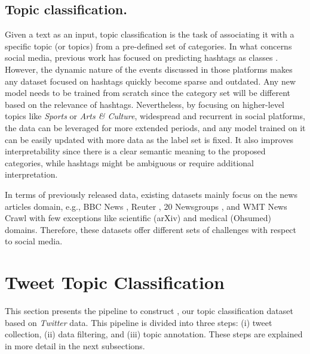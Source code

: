 \subsection{Topic classification.}
Given a text as an input, topic classification is the task of associating it with a specific topic (or topics) from a pre-defined set of categories. In what concerns social media, previous work has focused on predicting hashtags as classes \cite{tweet2vec}. However, the dynamic nature of the events discussed in those platforms makes any dataset focused on hashtags quickly become sparse and outdated. Any new model needs to be trained from scratch since the category set will be different based on the relevance of hashtags. 
Nevertheless, by focusing on higher-level topics like \emph{Sports} or \emph{Arts \& Culture}, widespread and recurrent in social platforms, the data can be leveraged for more extended periods, and any model trained on it can be easily updated with more data as the label set is fixed. It also improves interpretability since there is a clear semantic meaning to the proposed categories, while hashtags might be ambiguous or require additional interpretation.

In terms of previously released data, existing datasets mainly focus on the news articles domain, e.g., BBC News \cite{greene2006practical}, Reuter \cite{lewis2004rcv1}, 20 Newsgroups \cite{lang1995newsweeder}, and WMT News Crawl \cite{lazaridou2021mind} with few exceptions like scientific (arXiv) \cite{lazaridou2021mind} and medical (Ohsumed) \cite{hersh1994ohsumed} domains. Therefore, these datasets offer different sets of challenges with respect to social media.


\section{Tweet Topic Classification}\label{data}

This section presents the pipeline to construct \TweetTopic, our topic classification dataset based on \textit{Twitter} data. This pipeline is divided into three steps: (i) tweet collection, (ii) data filtering, and (iii) topic annotation. These steps are explained in more detail in the next subsections.

